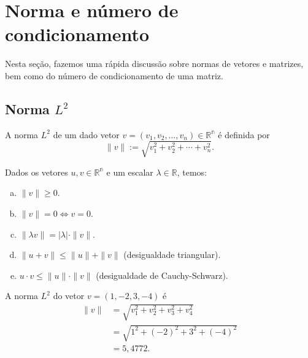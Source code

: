 \section{Norma e número de condicionamento}\label{cap_sl_direto_sec_norma_numcond}

Nesta seção, fazemos uma rápida discussão sobre normas de vetores e matrizes, bem como do número de condicionamento de uma matriz.

\subsection{Norma $L^2$}

A norma $L^2$ de um dado vetor $v = (v_1, v_2, \dotsc, v_n) \in \mathbb{R^n}$ é definida por
\begin{equation}
  \|v\| := \sqrt{v_1^2 + v_2^2 + \cdots + v_n^2}.
\end{equation}

\begin{prop}
  Dados os vetores $u,v \in \mathbb{R^n}$ e um escalar $\lambda\in\mathbb{R}$, temos:
  \begin{enumerate}[a)]
  \item $\|v\| \geq 0$.
  \item $\|v\| = 0 \Leftrightarrow v=0$.
  \item $\|\lambda v\| = |\lambda|\cdot \|v\|$.
  \item $\|u+v\| \leq \|u\| + \|v\|$ (desigualdade triangular).
  \item $u\cdot v \leq \|u\|\cdot\|v\|$ (desigualdade de Cauchy-Schwarz).
  \end{enumerate}
\end{prop}

\begin{ex}\label{ex:norma_vetor}
  A norma $L^2$ do vetor $v = (1, -2, 3, -4)$ é
  \begin{align}
    \|v\| &= \sqrt{v_1^2 + v_2^2 + v_3^2 + v_4^2}\\
    &= \sqrt{1^2 + (-2)^2 + 3^2 + (-4)^2}\\
    &= 5,4772.
  \end{align}

% 
\end{ex}


